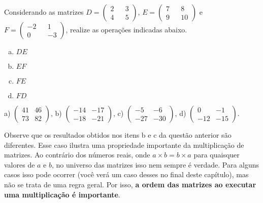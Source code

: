 \documentclass[main_estudante.tex]{subfiles}
\begin{document}
\begin{questao}
Considerando as matrizes $D=\begin{pmatrix} 2 && 3 \\ 4 && 5 \end{pmatrix}$, $E=\begin{pmatrix} 7 && 8 \\ 9 && 10 \end{pmatrix}$ e $F=\begin{pmatrix} -2 && 1 \\ 0 && -3 \end{pmatrix}$, realize as operações indicadas abaixo.
\begin{enumerate}[a)]
\item $DE$
\item $EF$
\item $FE$
\item $FD$
\end{enumerate}
\end{questao}

\begin{gabarito}
	\begin{gabaritoQuestao}
		a) $\begin{pmatrix} 41 & 46 \\ 73 & 82\end{pmatrix}$, b) $\begin{pmatrix} -14 & -17 \\ -18 & -21\end{pmatrix}$, c) $\begin{pmatrix} -5 & -6 \\ -27 & -30\end{pmatrix}$, d) $\begin{pmatrix} 0 & -1 \\ -12 & -15\end{pmatrix}$.

	\end{gabaritoQuestao}
\end{gabarito}

Observe que os resultados obtidos nos itens b e c da questão anterior são diferentes. Esse caso ilustra uma propriedade importante da multiplicação de matrizes. Ao contrário dos números reais, onde $a \times b = b \times a$ para quaisquer valores de $a$ e $b$, no universo das matrizes isso nem sempre é verdade. Para alguns casos isso pode ocorrer (você verá um caso desses no final deste capítulo), mas não se trata de uma regra geral. Por isso, \textbf{a ordem das matrizes ao executar uma multiplicação é importante}.
\end{document}
